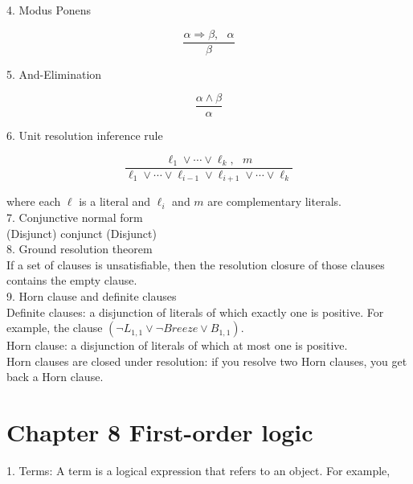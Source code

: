 \documentclass[12pt]{article}
\begin{document}
4. Modus Ponens

\begin{equation*}
  \frac {\alpha \Rightarrow \beta, \text{   } \alpha}{\beta}
\end{equation*}

5. And-Elimination

\begin{equation*}
  \frac {\alpha \land \beta}{\alpha} 
\end{equation*}

6. Unit resolution inference rule

\begin{equation*}
  \frac {\ell_1 \lor \cdots \lor \ell_k, \text{   } m}
        {\ell_1 \lor \cdots \lor \ell_{i-1} \lor \ell_{i+1} \lor \cdots \lor \ell_k}
\end{equation*}

where each $\ell$ is a literal and $\ell_i$ and $m$ are complementary literals. \\

7. Conjunctive normal form \\

(Disjunct) conjunct (Disjunct) \\

8. Ground resolution theorem \\

If a set of clauses is unsatisfiable, then the resolution closure of those clauses contains the empty clause. \\

9. Horn clause and definite clauses \\

Definite clauses: a disjunction of literals of which exactly one is positive. For example, the clause $(\lnot L_{1,1} \lor \lnot Breeze \lor B_{1,1})$. \\

Horn clause: a disjunction of literals of which at most one is positive. \\

Horn clauses are closed under resolution: if you resolve two Horn clauses, you get back a Horn clause. \\

\section{Chapter 8 First-order logic}

1. Terms: A term is a logical expression that refers to an object. For example,
\end{document}
